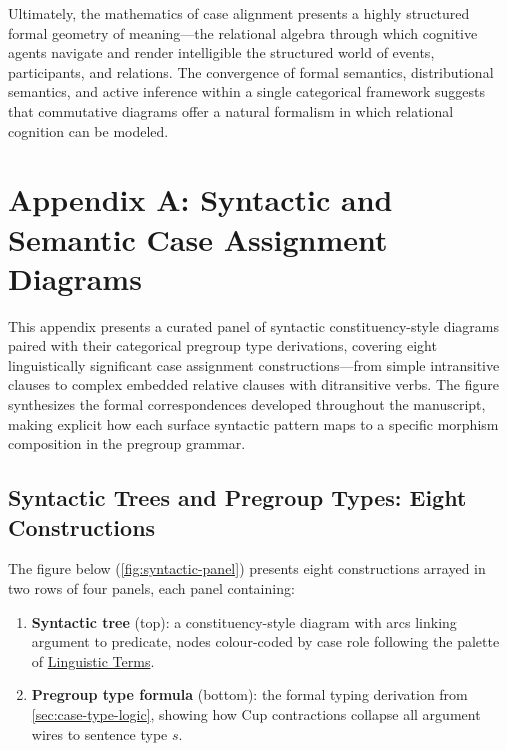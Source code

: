\documentclass[
]{article}
\providecommand{\tightlist}{%
  \setlength{\itemsep}{0pt}\setlength{\parskip}{0pt}}
\begin{document}
Ultimately, the mathematics of case alignment presents a highly
structured formal geometry of meaning---the relational algebra through
which cognitive agents navigate and render intelligible the structured
world of events, participants, and relations. The convergence of formal
semantics, distributional semantics, and active inference within a
single categorical framework suggests that commutative diagrams offer a
natural formalism in which relational cognition can be modeled.

\newpage

\section{Appendix A: Syntactic and Semantic Case Assignment
Diagrams}\label{sec:syntactic-diagrams}

This appendix presents a curated panel of syntactic constituency-style
diagrams paired with their categorical pregroup type derivations,
covering eight linguistically significant case assignment
constructions---from simple intransitive clauses to complex embedded
relative clauses with ditransitive verbs. The figure synthesizes the
formal correspondences developed throughout the manuscript, making
explicit how each surface syntactic pattern maps to a specific morphism
composition in the pregroup grammar.

\subsection{Syntactic Trees and Pregroup Types: Eight
Constructions}\label{syntactic-trees-and-pregroup-types-eight-constructions}

The figure below (\autoref{fig:syntactic-panel}) presents eight
constructions arrayed in two rows of four panels, each panel containing:

\begin{enumerate}
\def\labelenumi{\arabic{enumi}.}
\tightlist
\item
  \textbf{Syntactic tree} (top): a constituency-style diagram with arcs
  linking argument to predicate, nodes colour-coded by case role
  following the palette of
  \href{11b_notation.md\#sec:notation-linguistic}{Linguistic Terms}.
\item
  \textbf{Pregroup type formula} (bottom): the formal typing derivation
  from \autoref{sec:case-type-logic}, showing how Cup contractions
  collapse all argument wires to sentence type \(s\).
\end{enumerate}
\end{document}
